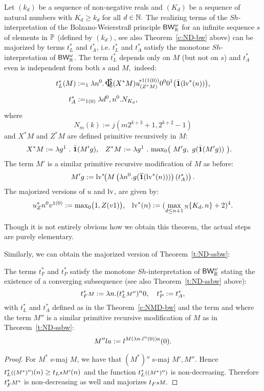 \begin{thm}\label{c:NMD-bw} Let $(k_d)$ be a sequence of non-negative reals 
and $(K_d)$ be a sequence of natural numbers with $K_d\ge k_d$ for all 
$d\in\mathbb{N}.$ 
The realizing terms of the
$Sh$-interpretation of the Bolzano-Weierstra{\ss} principle $\textsf{\upshape BW}^\omega_{\mathbb{R}}$ 
for an infinite sequence $s$
of elements in $\mathbb{P}$ (defined by $(k_d)$, see also Theorem~\ref{c:ND-bw} above)
can be majorized by terms $t_L^*$ and $t_A^*$, i.e. $t_L^*$ and 
$t_A^*$ satisfy the monotone $Sh$-interpretation of $\textsf{\upshape BW}^\omega_{\mathbb{R}}$.
The term $t_L^*$ depends only
on $M$ (but not on $s$) and $t_A^*$ even is independent from both $s$ and 
$M,$ indeed:
\begin{align*}
t_L^*(M)&:=_1
   \lambda n^0.\xTWfM{(X^*M)}{(Z^*M)}
\big(\bar\one(\l^*(n))\big)\text{,} \\
t_A^*&:=_{1(0)}\lambda d^0,n^0.N_{K_d}
\text{,}
\end{align*}
where 
\[ N_m(k):=j(m2^{k+3}+1,2^{k+2}-1) \]
and $X^*M$ and $Z^*M$ are defined primitive recursively in $M$:
\begin{align*}
{X^*M}&:=\lambda g^1\ .\ \bar\one(M'g)  \text{,} &
{Z^*M}&:=\lambda g^1\ .\ {\max}_0\big(\ M'g,\ g(\bar\one(M'g))\ \big)
\text{.}
\end{align*}
The term $M'$ is a similar primitive recursive modification of $M$ as before: 
\[
{M'}g:= \mathrm {lv}^*\!\!\left(M
   \left( \lambda n^0.g(\overline{\mathbf1}(\mathrm {lv}^*(n))) \right)
   \left( t_A^* \right)\right).
\]
The majorized versions of $u$ and $\mathrm {lv}$, are given by:
\[
u^*_{Z}n^0v^{1(0)}  :=  {\max}_0\big(1,Z(v1)\big)  \text{,}
\quad \mathrm {lv}^*(n):=(\max_{d\leq n+1} {} _{\mathbb{N}} \{K_d,n\}+2)^4
\text{.}
\]
\end{thm}
Though it is not entirely obvious how we obtain this theorem, the
actual steps are purely elementary. 

Similarly, we can obtain the majorized version of Theorem~\ref{t:ND-ssbw}:
\begin{thm}\label{t:NMD-BW}
The terms $t_F^*$ and $t_P^*$ satisfy the monotone $Sh$-interpretation of 
$\textsf{\upshape BW}^\omega_{\mathbb{R}}$ 
stating the existence of  a converging subsequence (see also 
Theorem~\ref{t:ND-ssbw} above):
\[
t_F^*\args{M}:=\lambda n.(t_L^*\args{M''})^n0,\quad t_P^*:=t_A^*,
\]
with $t_L^*$ and $t_A^*$ defined as in the Theorem~\ref{c:NMD-bw} and the 
term and where 
the term $M''$ is a similar primitive recursive modification of $M$ as in 
Theorem~\ref{t:ND-ssbw}: 
\[
{M''}la:= l^{M(\lambda n . l^n(0))a}(0)\text.
\]
\end{thm}
\begin{proof}
For $M^*$ s-maj $M$, we have that 
$(M^*)''$ s-maj $M',M''.$ Hence 
$t_L^*\args{((M^*)'')}(n)\ge t_L\args{sM'}(n)$  
and the function $t_L^*\args{((M^*)'')}$ 
is non-decreasing. Therefore
$t_F^*\args{M^*}$ is non-decreasing as well and majorizes $t_F\args{sM}.$
\end{proof}


